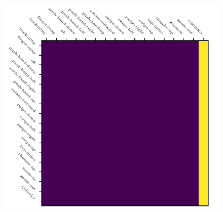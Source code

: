 \begin{figure}[h]
  \centering
  \includegraphics{figures/results/confusion-matrices/ctc/inceptionv3}
  \caption{}
  \label{fig:iv3-confusion}
\end{figure}
